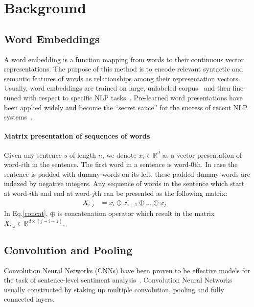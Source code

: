 \section{Background}
\subsection{Word Embeddings}
A word embedding is a function mapping from words to their continuous vector representations.
The purpose of this method is to encode relevant syntactic and semantic features of words as relationships among their representation vectors.
Usually, word embeddings are trained on large, unlabeled corpus~\cite{glove,word2vec} and then fine-tuned with respect to specific NLP tasks~\cite{treeLSTM,KimCNN}.   
Pre-learned word presentations have been applied widely and become the ``secret sauce'' for the success of recent NLP systems~\cite{Luong_betterword}.
\paragraph{Matrix presentation of sequences of words}
Given any sentence \(s\) of length \(n\), we denote \(x_i \in \mathbb{R}^d\) as a vector presentation of word-\(i\)th in the sentence.
The first word in a sentence is word-\(0\)th.
In case the sentence is padded with dummy words on its left, these padded dummy words are indexed by negative integers.
Any sequence of words in the sentence which start at word-\(i\)th and end at word-\(j\)th can be presented as the following matrix:
\begin{align}
X_{i:j} &= x_i \oplus x_{i+1} \oplus ... \oplus x_{j} &\label{concat}
\end{align}
In Eq.\eqref{concat}, \(\oplus\) is concatenation operator which result in the matrix \(X_{i:j} \in \mathbb{R}^{d \times (j-i+1)}\).
\subsection{Convolution and Pooling}
Convolution Neural Networks (CNNs) have been proven to be effective models for the task of sentence-level sentiment analysis~\cite{KimCNN, DCNN,2-layer-cnn}.
Convolution Neural Networks usually constructed by staking up multiple convolution, pooling and fully connected layers.
